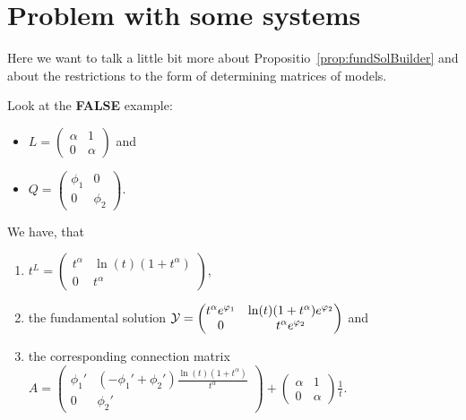 \chapter{Problem with some systems}
\PROBLEM[remove?]

Here we want to talk a little bit more about
Propositio~\ref{prop:fundSolBuilder} and about the restrictions to the form of
determining matrices of models.

Look at the \textbf{FALSE} example:
\begin{itemize}
  \item $L=\begin{pmatrix} \alpha & 1 \\ 0 & \alpha \end{pmatrix}$ and
  \item $Q=\begin{pmatrix} \phi_1 & 0 \\ 0 & \phi_2 \end{pmatrix}$.
\end{itemize}
\begin{lem}
  We have, that 
  \begin{enumerate}
    \item $t^L=
      \begin{pmatrix}
        t^\alpha & \ln(t)(1+t^\alpha) \\ 0 & t^\alpha
      \end{pmatrix}$,
    \item the fundamental solution $\mathcal{Y}=
      \begin{pmatrix}
        t^\alpha e^{\varphi_1} & \ln(t)(1+t^\alpha)e^{\varphi_2}
        \\0 & t^\alpha e^{\varphi_2}
      \end{pmatrix}$ and
    \item the corresponding connection matrix $A=
      \begin{pmatrix}
        \phi_1' & (-\phi_1'+\phi_2')\frac{\ln(t)(1+t^\alpha)}{t^\alpha}
        \\0 & \phi_2'
      \end{pmatrix} 
      +
      \begin{pmatrix} \alpha & 1 \\ 0 & \alpha \end{pmatrix} \frac{1}{t}$.
  \end{enumerate}
\end{lem}
